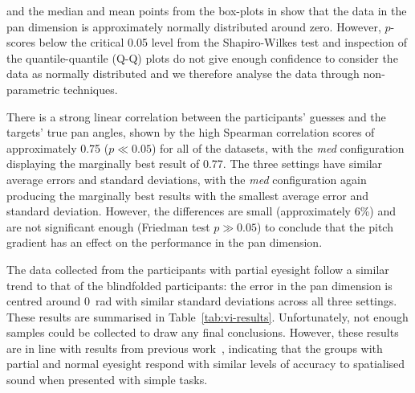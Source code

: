 \documentclass[sigconf, review=true, screen=true, anonymous=true]{acmart}
\begin{document}
 and the median and mean points from the box-plots in  show that the data in the pan dimension is approximately normally distributed around zero.
However, $p$-scores below the critical 0.05 level from the Shapiro-Wilkes test and inspection of the quantile-quantile (Q-Q) plots do not give enough confidence to consider the data as normally distributed and we therefore analyse the data through non-parametric techniques. 

There is a strong linear correlation between the participants' guesses and the targets' true pan angles, shown by the high Spearman correlation scores of approximately 0.75 ($p \ll 0.05$) for all of the datasets, with the \emph{med} configuration displaying the marginally best result of 0.77.
The three settings have similar average errors and standard deviations, with the \emph{med} configuration again producing the marginally best results with the smallest average error and standard deviation.
However, the differences are small (approximately 6\%) and are not significant enough (Friedman test $p \gg 0.05$) to conclude that the pitch gradient has an effect on the performance in the pan dimension. 

The data collected from the participants with partial eyesight follow a similar trend to that of the blindfolded participants: the error in the pan dimension is centred around \SI{0}{\radian} with similar standard deviations across all three settings.
These results are summarised in Table~\ref{tab:vi-results}.
Unfortunately, not enough samples could be collected to draw any final conclusions.
However, these results are in line with results from previous work~\cite{zwiers2001spatial}, indicating that the groups with partial and normal eyesight respond with similar levels of accuracy to spatialised sound when presented with simple tasks. 
\end{document}
